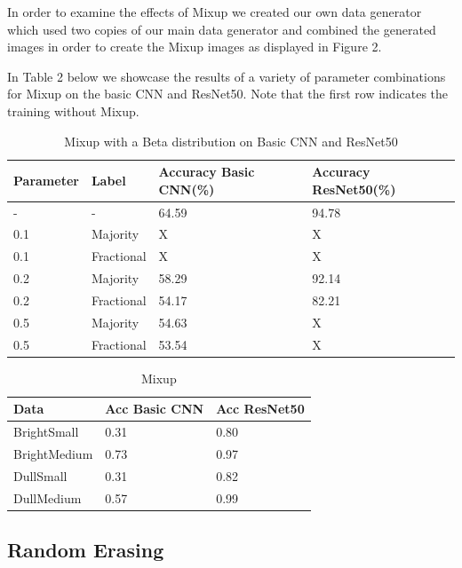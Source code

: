 \documentclass{article}
\begin{document}
In order to examine the effects of Mixup we created our own data generator which used two copies of our main data generator and combined the generated images in order to create the Mixup images as displayed in Figure 2.

In Table 2 below we showcase the results of a variety of parameter combinations for Mixup on the basic CNN and ResNet50. Note that the first row indicates the training without Mixup.

\begin{table}[H]
	\caption{Mixup with a Beta distribution on Basic CNN and ResNet50}
	\label{sample-table}
	\centering
	\begin{tabular}{llll}
		\toprule
		Parameter & Label & Accuracy Basic CNN(\%)& Accuracy ResNet50(\%) \\
		\midrule
		 -   & -        & 64.59   &   94.78 \\
		 0.1 & Majority & X       & X \\
		 0.1 & Fractional & X     & X\\ 
		 0.2 & Majority & 58.29   & 92.14 \\
		 0.2 & Fractional & 54.17 & 82.21\\ 
		 0.5 & Majority & 54.63   & X\\
		 0.5 & Fractional & 53.54 & X\\
		\bottomrule
	\end{tabular}
\end{table}

\begin{table}[H]
	\caption{Mixup }
	\label{sample-table}
	\centering
	\begin{tabular}{lll}
		\toprule
		Data &  Acc Basic CNN & Acc ResNet50 \\
		\midrule
		
		BrightSmall  & 0.31 &     0.80 \\
		BrightMedium & 0.73 &     0.97 \\
		DullSmall    & 0.31 &     0.82 \\
		DullMedium   & 0.57 &     0.99 \\
		\bottomrule
	\end{tabular}
\end{table}


\subsection{Random Erasing}
\end{document}
